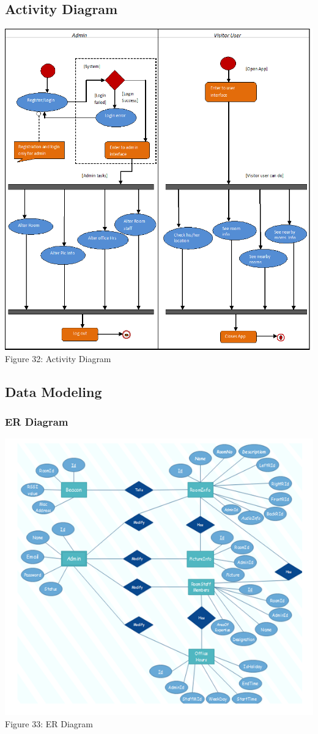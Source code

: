 \documentclass{article}
\begin{document}
\subsection{Activity Diagram}
\begin{center}
\includegraphics[scale=0.6]{ad}
\\Figure 32: Activity Diagram
\end{center}
\subsection{Data Modeling}
\subsubsection{ER Diagram}
\begin{center}
\includegraphics[scale=1.0]{erd}
\\Figure 33: ER Diagram
\end{center}
\end{document}
